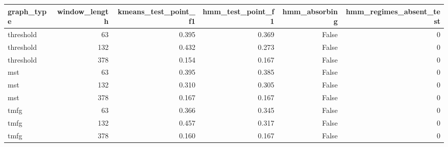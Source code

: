 \begin{tabular}{lrrrrr}
\toprule
graph\_type & window\_length & kmeans\_test\_point\_f1 & hmm\_test\_point\_f1 & hmm\_absorbing & hmm\_regimes\_absent\_test \\
\midrule
threshold & 63 & 0.395 & 0.369 & False & 0 \\
threshold & 132 & 0.432 & 0.273 & False & 0 \\
threshold & 378 & 0.154 & 0.167 & False & 0 \\
mst & 63 & 0.395 & 0.385 & False & 0 \\
mst & 132 & 0.310 & 0.305 & False & 0 \\
mst & 378 & 0.167 & 0.167 & False & 0 \\
tmfg & 63 & 0.366 & 0.345 & False & 0 \\
tmfg & 132 & 0.457 & 0.317 & False & 0 \\
tmfg & 378 & 0.160 & 0.167 & False & 0 \\
\bottomrule
\end{tabular}
